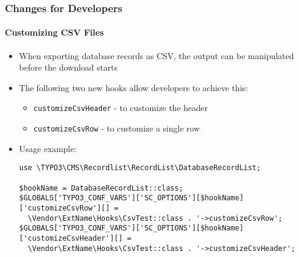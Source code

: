 
\begin{frame}[fragile]
	\frametitle{Changes for Developers}
	\framesubtitle{Customizing CSV Files}

	\lstset{basicstyle=\tiny\ttfamily}

	\begin{itemize}
		\item When exporting database records as CSV, the output can be
			manipulated before the download starts
		\item The following two new hooks allow developers to achieve this:

			\begin{itemize}
			\smaller
				\item \texttt{customizeCsvHeader} - to customize the header
				\item \texttt{customizeCsvRow} - to customize a single row
			\end{itemize}

		\item Usage example:

			\begin{lstlisting}
use \TYPO3\CMS\Recordlist\RecordList\DatabaseRecordList;

$hookName = DatabaseRecordList::class;
$GLOBALS['TYPO3_CONF_VARS']['SC_OPTIONS'][$hookName]['customizeCsvRow'][] =
  \Vendor\ExtName\Hooks\CsvTest::class . '->customizeCsvRow';
$GLOBALS['TYPO3_CONF_VARS']['SC_OPTIONS'][$hookName]['customizeCsvHeader'][] =
  \Vendor\ExtName\Hooks\CsvTest::class . '->customizeCsvHeader';
\end{lstlisting}

	\end{itemize}

\end{frame}


